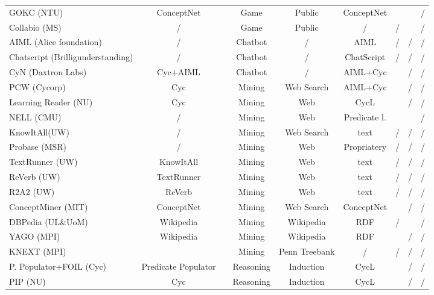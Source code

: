 \begin{landscape}
\begin{table}[htb]
\begin{adjustbox}{width=1.6\textwidth}
\begin{tabular}{lclcccccc}
		GOKC (NTU) & ConceptNet  & \parencite{Kuo2010}  & Game & Public  & ConceptNet  & \checkmark  & \checkmark  & /  \\
		Collabio (MS) & /  & \parencite{Bernstein2010}  & Game & Public  & /  & /  & \checkmark  & /  \\
		AIML (Alice foundation) & /  & \parencite{Wallace2003}  & Chatbot & /  & AIML  & /  & /  & /  \\
		Chatscript (Brilligunderstanding) & /  & \parencite{Wilcox2011}  & Chatbot & /  & ChatScript  & /  & /  & /  \\
		CyN (Daxtron Labs) & Cyc+AIML  & \parencite{Wilcox2011}  & Chatbot & /  & AIML+Cyc  & \checkmark  & /  & /  \\
	    PCW (Cycorp) & Cyc  & \parencite{Matuszek2004}  & Mining & Web Search  & AIML+Cyc  & \checkmark  & /  & /  \\
 		Learning Reader (NU) & Cyc & \parencite{Forbus2007} & Mining & Web & CycL & \checkmark & / & / \\
		NELL (CMU) & / & \parencite{Mitchell2015} & Mining & Web & Predicate l. & \checkmark & \checkmark & / \\ 
		KnowItAll(UW) & / & \parencite{Etzioni2004} & Mining & Web Search & text & / & / & / \\
		Probase (MSR) & / & \parencite{Wu2012}  & Mining & Web & Propriatery & / & / & / \\
        TextRunner (UW) & KnowItAll & \parencite{Soderland2007} & Mining & Web & text & / & / & / \\
		ReVerb (UW) & TextRunner & \parencite{Fader2011} & Mining & Web & text & / & / & / \\
		R2A2 (UW) & ReVerb & \parencite{Etzioni2011} & Mining & Web & text & / & / & / \\
		ConceptMiner (MIT) & ConceptNet & \parencite{Eslick2006} &Mining & Web Search & ConceptNet & \checkmark & / & / \\ 
		DBPedia (UL\&UoM) & Wikipedia & \parencite{Lehmann2015} & Mining & Wikipedia &  RDF & / &\checkmark & / \\
		YAGO (MPI) & Wikipedia & \parencite{Suchanek2008} & Mining & Wikipedia &  RDF & \checkmark & / & / \\
		KNEXT (MPI) & \ & \parencite{Schuber2002} & Mining & Penn Treebank &  / & / & / & / \\
	    P. Populator+FOIL (Cyc) & Predicate Populator & \parencite{Witbrock2005} & Reasoning & Induction &  CycL & \checkmark & / & / \\
	    PIP (NU) & Cyc & \parencite{Sharma2010} & Reasoning & Induction &  CycL & \checkmark & / & / \\
		\hline
	\end{tabular}
	\end{adjustbox}
\end{table}
\end{landscape}

